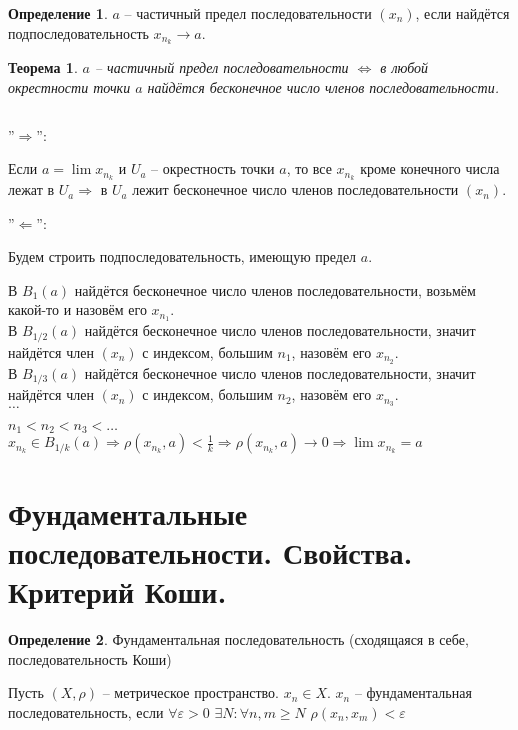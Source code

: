 \documentclass[12pt,letterpaper]{report}
\makeatletter
\newtheorem{theorem}{Теорема}
\theoremstyle{definition}
\newtheorem*{conj}{Определение}
\renewenvironment{proof}[1][\proofname]{%
   \par\pushQED{\qed}\normalfont%
   \topsep6\p@\@plus6\p@\relax
   \trivlist\item[\hskip\labelsep\bfseries#1\@addpunct{.}]%
   \ignorespaces
}{%
   \popQED\endtrivlist\@endpefalse
}
\makeatother
\begin{document}
    \begin{conj}
    $a$ -- частичный предел последовательности $(x_n)$, если найдётся
    подпоследовательность $x_{n_k} \rightarrow a$.
    \end{conj}
    \begin{theorem}
    $a$ -- частичный предел последовательности $\Leftrightarrow$
    в любой окрестности точки $a$ найдётся бесконечное число членов
    последовательности.
    \end{theorem}
    \begin{proof} $ $
    
        ''$\Longrightarrow$'':
    
        Если $a = \lim x_{n_k}$ и $U_a$ -- окрестность точки $a$, то
        все $x_{n_k}$ кроме конечного числа лежат в $U_a \Rightarrow$
        в $U_a$ лежит бесконечное число членов последовательности $(x_n)$.
    
        ''$\Longleftarrow$'':
    
        Будем строить подпоследовательность, имеющую предел $a$.
    
        В $B_{1}(a)$ найдётся бесконечное число членов последовательности,
        возьмём какой-то и назовём его $x_{n_1}$.\\
        В $B_{1/2}(a)$ найдётся бесконечное число членов
        последовательности, значит найдётся член $(x_n)$ с индексом, большим
        $n_1$, назовём его $x_{n_2}$.\\
        В $B_{1/3}(a)$ найдётся бесконечное число членов
        последовательности, значит найдётся член $(x_n)$ с индексом, большим
        $n_2$, назовём его $x_{n_3}$.\\
        $\dots$
    
        $n_1 < n_2 < n_3 < \dots$\\
        $x_{n_k} \in B_{1/k}(a) \Rightarrow \rho(x_{n_k}, a) < \frac1k
        \Rightarrow \rho(x_{n_k}, a) \rightarrow 0 \Rightarrow
        \lim x_{n_k} = a$
    
    \end{proof}
    
    \section{Фундаментальные последовательности. Свойства. Критерий Коши.}
    
    \begin{conj}
    Фундаментальная последовательность (сходящаяся в себе,
    последовательность Коши)
    \end{conj}
    Пусть $(X, \rho)$ -- метрическое пространство. $x_n \in X$.
    $x_n$ -- фундаментальная последовательность, если $\forall
    \varepsilon > 0 \,\, \exists N : \forall n, m \geq N \,\,
    \rho(x_n, x_m) < \varepsilon$
    
\end{document}
